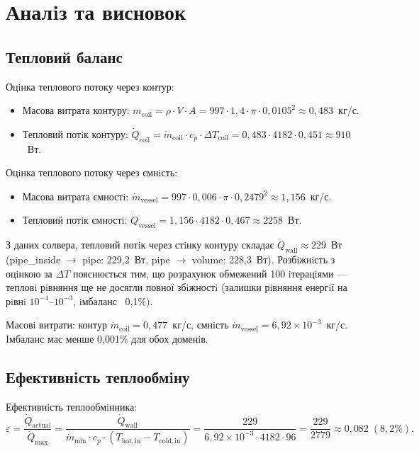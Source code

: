 \section{Аналiз та висновок}

\subsection{Тепловий баланс}

Оцiнка теплового потоку через контур:
\begin{itemize}
  \item Масова витрата контуру: $\dot{m}_{\mathrm{coil}} = \rho \cdot V \cdot A = 997 \cdot 1{,}4 \cdot \pi \cdot 0{,}0105^2 \approx 0{,}483$~кг/с.
  \item Тепловий потiк контуру: $\dot{Q}_{\mathrm{coil}} = \dot{m}_{\mathrm{coil}} \cdot c_p \cdot \Delta T_{\mathrm{coil}} = 0{,}483 \cdot 4182 \cdot 0{,}451 \approx 910$~Вт.
\end{itemize}

Оцiнка теплового потоку через ємнiсть:
\begin{itemize}
  \item Масова витрата ємностi: $\dot{m}_{\mathrm{vessel}} = 997 \cdot 0{,}006 \cdot \pi \cdot 0{,}2479^2 \approx 1{,}156$~кг/с.
  \item Тепловий потiк ємностi: $\dot{Q}_{\mathrm{vessel}} = 1{,}156 \cdot 4182 \cdot 0{,}467 \approx 2258$~Вт.
\end{itemize}

З даних солвера, тепловий потiк через стiнку контуру складає $\dot{Q}_{\mathrm{wall}} \approx 229$~Вт (pipe\_inside $\to$ pipe: 229{,}2~Вт, pipe $\to$ volume: 228{,}3~Вт). Розбiжнiсть з оцiнкою за $\Delta T$ пояснюється тим, що розрахунок обмежений 100 iтерацiями --- тепловi рiвняння ще не досягли повної збiжностi (залишки рiвняння енергiї на рiвнi $10^{-4}$--$10^{-3}$, iмбаланс ~0{,}1\%).

Масовi витрати: контур $\dot{m}_{\mathrm{coil}} = 0{,}477$~кг/с, ємнiсть $\dot{m}_{\mathrm{vessel}} = 6{,}92 \times 10^{-3}$~кг/с. Iмбаланс мас менше 0{,}001\% для обох доменiв.

\subsection{Ефективнiсть теплообмiну}

Ефективнiсть теплообмiнника:
\[
  \varepsilon = \frac{\dot{Q}_{\mathrm{actual}}}{\dot{Q}_{\mathrm{max}}}
  = \frac{\dot{Q}_{\mathrm{wall}}}{\dot{m}_{\min} \cdot c_p \cdot (T_{\mathrm{hot,in}} - T_{\mathrm{cold,in}})}
  = \frac{229}{6{,}92 \times 10^{-3} \cdot 4182 \cdot 96}
  = \frac{229}{2779}
  \approx 0{,}082 \; (8{,}2\%).
\]


